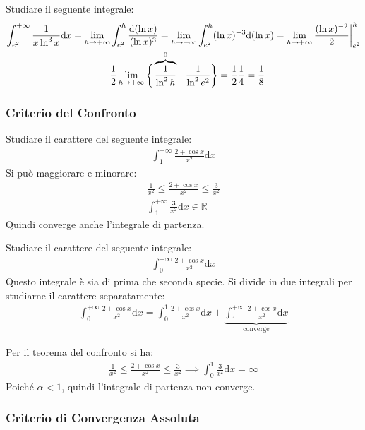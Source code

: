 \documentclass{article}
\newcommand{\df}{\mathrm{d}}
\newcommand{\intab}[4]{\displaystyle\int_{#1}^{#2}{#3}\df{#4}}
\numberwithin{equation}{subsection}
\begin{document}
Studiare il seguente integrale:
\begin{gather*}
    \displaystyle\intab{e^2}{+\infty}{\frac{1}{x\ln^3 x}}{x}=\lim_{h\to+\infty}\int_{e^2}^{h}\frac{\df (\ln x)}{(\ln x)^3}=
    \lim_{h\to+\infty}\int_{e^2}^h(\ln x)^{-3}\df(\ln x)=\lim_{h\to+\infty}\frac{(\ln x)^{-2}}{2}\bigg|_{e^2}^h\\
    -\frac{1}{2}\lim_{h\to+\infty}\bigg\{\overbrace{\frac{1}{\ln^2 h}}^0-\frac{1}{\ln^2e^2}\bigg\}=\frac{1}{2}\frac{1}{4}=\frac{1}{8}
\end{gather*}

\subsubsection{Criterio del Confronto}

Studiare il carattere del seguente integrale:
\begin{gather*}
    \displaystyle\int_1^{+\infty}\frac{2+\cos x}{x^2}\df x
\end{gather*}
Si può maggiorare e minorare:
\begin{gather*}
    \displaystyle\frac{1}{x^2}\leq\frac{2+\cos x}{x^2}\leq\frac{3}{x^2}\\
    \displaystyle\int_1^{+\infty}\frac{3}{x^2}\df x\in\mathbb{R}
\end{gather*}
Quindi converge anche l'integrale di partenza. 


Studiare il carattere del seguente integrale:
\begin{gather*}
    \displaystyle\int_0^{+\infty}\frac{2+\cos x}{x^2}\df x
\end{gather*}
Questo integrale è sia di prima che seconda specie. Si divide in due integrali per studiarne il carattere separatamente:
\begin{gather*}
    \displaystyle\int_0^{+\infty}\frac{2+\cos x}{x^2}\df x=
    \int_0^{1}\frac{2+\cos x}{x^2}\df x+
    \underbrace{\int_1^{+\infty}\frac{2+\cos x}{x^2}\df x}_{\mbox{converge}}
\end{gather*}

Per il teorema del confronto si ha:
\begin{gather*}
    \displaystyle\frac{1}{x^2}\leq\frac{2+\cos x}{x^2}\leq\frac{3}{x^2}\implies
    \displaystyle\int_0^{1}\frac{3}{x^2}\df x=\infty
\end{gather*}
Poiché $\alpha<1$, quindi l'integrale di partenza non converge. 

\subsubsection{Criterio di Convergenza Assoluta}
\end{document}
